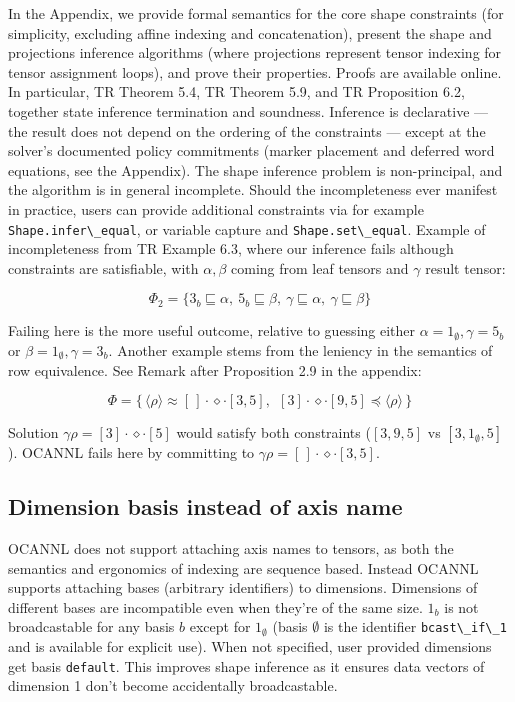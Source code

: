 \documentclass[
  10pt,
  letterpaper,
]{article}
\newcommand{\passthrough}[1]{#1}
\begin{document}
In the Appendix, we provide formal semantics for the core shape
constraints (for simplicity, excluding affine indexing and
concatenation), present the shape and projections inference algorithms
(where projections represent tensor indexing for tensor assignment
loops), and prove their properties. Proofs are available online. In
particular, TR Theorem 5.4, TR Theorem 5.9, and TR Proposition 6.2,
together state inference termination and soundness. Inference is
declarative --- the result does not depend on the ordering of the
constraints --- except at the solver's documented policy commitments
(marker placement and deferred word equations, see the Appendix). The
shape inference problem is non-principal, and the algorithm is in
general incomplete. Should the incompleteness ever manifest in practice,
users can provide additional constraints via for example
\passthrough{\lstinline!Shape.infer\_equal!}, or variable capture and
\passthrough{\lstinline!Shape.set\_equal!}. Example of incompleteness
from TR Example 6.3, where our inference fails although constraints are
satisfiable, with \(\alpha,\beta\) coming from leaf tensors and
\(\gamma\) result tensor:

\[
\Phi_2 = \{3_b \sqsubseteq \alpha,\ 5_b \sqsubseteq \beta,\ \gamma \sqsubseteq \alpha,\ \gamma \sqsubseteq \beta\}
\]

Failing here is the more useful outcome, relative to guessing either
\(\alpha = 1_\emptyset, \gamma = 5_b\) or
\(\beta = 1_\emptyset, \gamma = 3_b\). Another example stems from the
leniency in the semantics of row equivalence. See Remark after
Proposition 2.9 in the appendix:

\[
\Phi = \{\,\langle\rho\rangle \approx [\,]\cdot\diamond\cdot[3,5],\ \ [3]\cdot\diamond\cdot[9,5] \preceq \langle\rho\rangle\,\}
\]

Solution \(\gamma\rho = [3]\cdot\diamond\cdot[5]\) would satisfy both
constraints (\([3,9,5]\) vs \([3,1_\emptyset,5]\)). OCANNL fails here by
committing to \(\gamma\rho = [\,]\cdot\diamond\cdot[3,5]\).

\subsection{Dimension basis instead of axis
name}\label{dimension-basis-instead-of-axis-name}

OCANNL does not support attaching axis names to tensors, as both the
semantics and ergonomics of indexing are sequence based. Instead OCANNL
supports attaching bases (arbitrary identifiers) to dimensions.
Dimensions of different bases are incompatible even when they're of the
same size. \(1_b\) is not broadcastable for any basis \(b\) except for
\(1_\emptyset\) (basis \(\emptyset\) is the identifier
\passthrough{\lstinline!bcast\_if\_1!} and is available for explicit
use). When not specified, user provided dimensions get basis
\passthrough{\lstinline!default!}. This improves shape inference as it
ensures data vectors of dimension 1 don't become accidentally
broadcastable.
\end{document}
